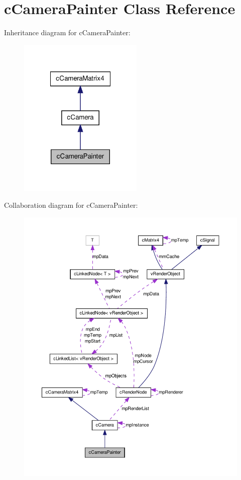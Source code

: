 \hypertarget{classc_camera_painter}{
\section{cCameraPainter Class Reference}
\label{classc_camera_painter}
}


Inheritance diagram for cCameraPainter:
\nopagebreak
\begin{figure}[H]
\begin{center}
\leavevmode
\includegraphics[width=168pt]{classc_camera_painter__inherit__graph}
\end{center}
\end{figure}


Collaboration diagram for cCameraPainter:
\nopagebreak
\begin{figure}[H]
\begin{center}
\leavevmode
\includegraphics[width=400pt]{classc_camera_painter__coll__graph}
\end{center}
\end{figure}

